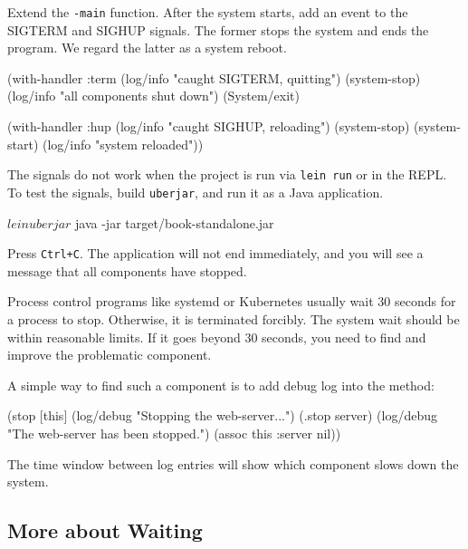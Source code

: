 \fi

Extend the \verb|-main| function. After the system starts, add an event to the SIGTERM and SIGHUP signals. The former stops the system and ends the program. We regard the latter as a system reboot.


\begin{english}
  \begin{clojure}
(with-handler :term
  (log/info "caught SIGTERM, quitting")
  (system-stop)
  (log/info "all components shut down")
  (System/exit)

(with-handler :hup
  (log/info "caught SIGHUP, reloading")
  (system-stop)
  (system-start)
  (log/info "system reloaded"))
  \end{clojure}
\end{english}

The signals do not work when the project is run via \verb|lein run| or in the REPL. To test the signals, build \verb|uberjar|, and run it as a Java application.

\begin{english}
  \begin{bash}
$ lein uberjar
$ java -jar target/book-standalone.jar
  \end{bash}
\end{english}

Press \verb|Ctrl+C|. The application will not end immediately, and you will see a message that all components have stopped.

Process control programs like systemd or Kubernetes usually wait 30 seconds for a process to stop. Otherwise, it is terminated forcibly. The system wait should be within reasonable limits. If it goes beyond 30 seconds, you need to find and improve the problematic component.

A simple way to find such a component is to add debug log into the  method:

\begin{english}
  \begin{clojure}
(stop [this]
  (log/debug "Stopping the web-server...")
  (.stop server)
  (log/debug "The web-server has been stopped.")
  (assoc this :server nil))
  \end{clojure}
\end{english}

The time window between log entries will show which component slows down the system.

\subsection{More about Waiting}

